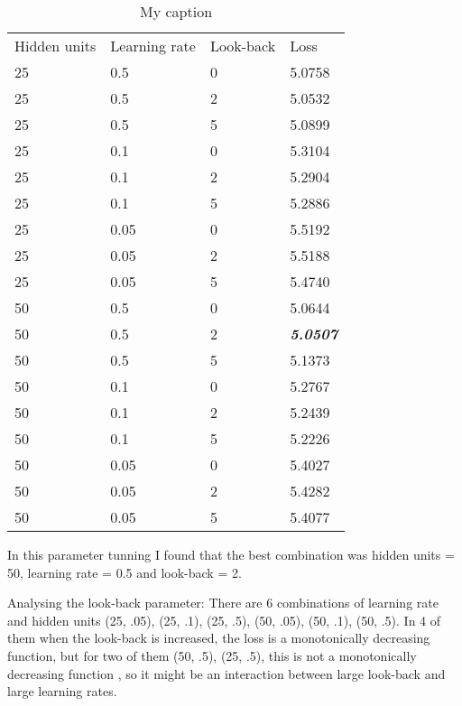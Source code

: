 \documentclass{article}
\begin{document}
\begin{table}[ht!]
\centering
\caption{My caption}
\label{my-label}
\begin{tabular}{llll}
Hidden units & Learning rate & Look-back & Loss         \\
25           & 0.5           & 0         & 5.0758 \\
25           & 0.5           & 2         & 5.0532 \\
25           & 0.5           & 5         & 5.0899 \\
25           & 0.1           & 0         & 5.3104 \\
25           & 0.1           & 2         & 5.2904 \\
25           & 0.1           & 5         & 5.2886 \\
25           & 0.05          & 0         & 5.5192 \\
25           & 0.05          & 2         & 5.5188 \\
25           & 0.05          & 5         & 5.4740 \\
50           & 0.5           & 0         & 5.0644 \\
50           & 0.5           & 2         & \textit{\textbf{5.0507}} \\
50           & 0.5           & 5         & 5.1373 \\
50           & 0.1           & 0         & 5.2767 \\
50           & 0.1           & 2         & 5.2439  \\
50           & 0.1           & 5         & 5.2226 \\
50           & 0.05          & 0         & 5.4027 \\
50           & 0.05          & 2         & 5.4282 \\
50           & 0.05          & 5         & 5.4077
\end{tabular}
\end{table}

In this parameter tunning I found that the best combination was hidden units = 50, learning rate = 0.5 and look-back = 2.

Analysing the look-back parameter: There are 6 combinations of learning rate and hidden units {(25, .05), (25, .1), (25, .5), (50, .05), (50, .1), (50, .5)}. In 4 of them when the look-back is increased, the loss is a monotonically decreasing function, but for two of them {(50, .5), (25, .5)}, this is not a monotonically decreasing function , so it might be an interaction between large look-back and large learning rates.
\end{document}
